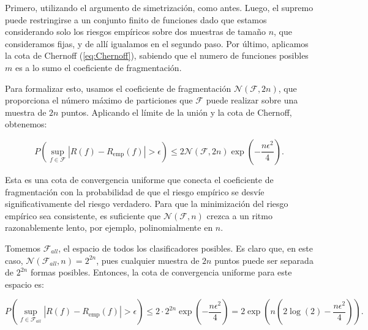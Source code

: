 \documentclass{report}
\begin{document}
Primero, utilizando el argumento de simetrización, como antes. Luego, el supremo puede restringirse a un conjunto finito de funciones
dado que estamos considerando solo los riesgos empíricos sobre dos muestras de tamaño $n$, que consideramos fijas, y de allí igualamos
en el segundo paso. Por último, aplicamos la cota de Chernoff (\ref{eq:Chernoff}), sabiendo que el numero de funciones
posibles $m$ es a lo sumo el coeficiente de fragmentación.\newline

Para formalizar esto, usamos el coeficiente de fragmentación \(\mathcal{N}(\mathcal{F}, 2n)\), que proporciona el número máximo 
de particiones que \(\mathcal{F}\) puede realizar sobre una muestra de \(2n\) puntos. Aplicando el límite de la unión 
y la cota de Chernoff, obtenemos:

\begin{equation} 
    P\left(\sup_{f \in \mathcal{F}} |R(f) - R_{\text{emp}}(f)| > \epsilon \right) \leq 
    2\mathcal{N}(\mathcal{F}, 2n) \exp\left(-\frac{n\epsilon^2}{4}\right). \label{eq: cota convergencia coeficiente fragmentacion}
\end{equation}

Esta es una cota de convergencia uniforme que conecta el coeficiente de fragmentación con la probabilidad de 
que el riesgo empírico se desvíe significativamente del riesgo verdadero. Para que la minimización del riesgo 
empírico sea consistente, es suficiente que $\mathcal{N}(\mathcal{F}, n)$ crezca a un ritmo razonablemente lento, por ejemplo, 
polinomialmente en \(n\).\newline

Tomemos $\mathcal{F}_{all}$, el espacio de todos los clasificadores posibles. Es claro que, en este caso, $\mathcal{N}(\mathcal{F}_{all}, n)=2^{2n}$,
pues cualquier muestra de $2n$ puntos puede ser separada de $2^{2n}$ formas posibles. Entonces, la cota de convergencia uniforme para este espacio
es:

\[
P\left(\sup_{f \in \mathcal{F}_{all}} |R(f) - R_{\text{emp}}(f)| > \epsilon \right) \leq
2\cdot 2^{2n} \exp\left(-\frac{n\epsilon^2}{4}\right) = 2\exp\left(n\left( 2\log(2) - \frac{n\epsilon^2}{4}\right)\right).
\]
\end{document}
